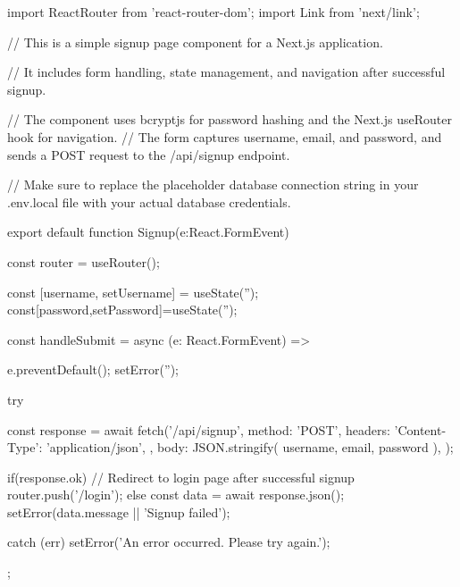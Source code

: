 import {ReactRouter} from 'react-router-dom';
import Link from 'next/link';

// This is a simple signup page component for a Next.js application.

// It includes form handling, state management, and navigation after successful signup.

// The component uses bcryptjs for password hashing and the Next.js useRouter hook for navigation.
// The form captures username, email, and password, and sends a POST request to the /api/signup endpoint.

// Make sure to replace the placeholder database connection string in your .env.local file with your actual database credentials.

export default function Signup(e:React.FormEvent) {
    const router = useRouter();

    const [username, setUsername] = useState('');
    const[password,setPassword]=useState('');

    const handleSubmit = async (e: React.FormEvent) => {
        e.preventDefault();
        setError('');

        try {
            const response = await fetch('/api/signup', {
                method: 'POST',
                headers: {
                    'Content-Type': 'application/json',
                },
                body: JSON.stringify({ username, email, password }),
            });

            if(response.ok){
                // Redirect to login page after successful signup
                router.push('/login');
            } else {
                const data = await response.json();
                setError(data.message || 'Signup failed');
            }
        } catch (err) {
            setError('An error occurred. Please try again.');
        }
    };

}

